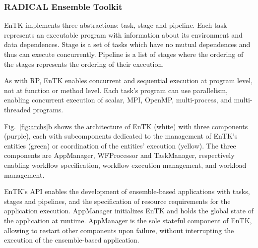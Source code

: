 \documentclass[preprint,12pt, a4paper]{elsarticle}
\begin{document}
\subsubsection{RADICAL Ensemble Toolkit}\label{sssec:arch_entk}

EnTK implements three abstractions: task, stage and pipeline. Each task
represents an executable program with information about its environment and
data dependences. Stage is a set of tasks which have no mutual dependences
and thus can execute concurrently. Pipeline is a list of stages where the
ordering of the stages represents the ordering of their execution.

As with RP, EnTK enables concurrent and sequential execution at program
level, not at function or method level. Each task's program can use
parallelism, enabling concurrent execution of scalar, MPI, OpenMP,
multi-process, and multi-threaded programs.


Fig.~\ref{fig:archs}b shows the architecture of EnTK (white) with three
components (purple), each with subcomponents dedicated to the management of
EnTK's entities (green) or coordination of the entities' execution (yellow).
The three components are AppManager, WFProcessor and TaskManager,
respectively enabling workflow specification, workflow execution management,
and workload management.


EnTK's API enables the development of ensemble-based applications with tasks,
stages and pipelines, and the specification of resource requirements for the
application execution. AppManager initializes EnTK and holds the global state
of the application at runtime. AppManager is the sole stateful component of
EnTK, allowing to restart other components upon failure, without interrupting
the execution of the ensemble-based application.
\end{document}
